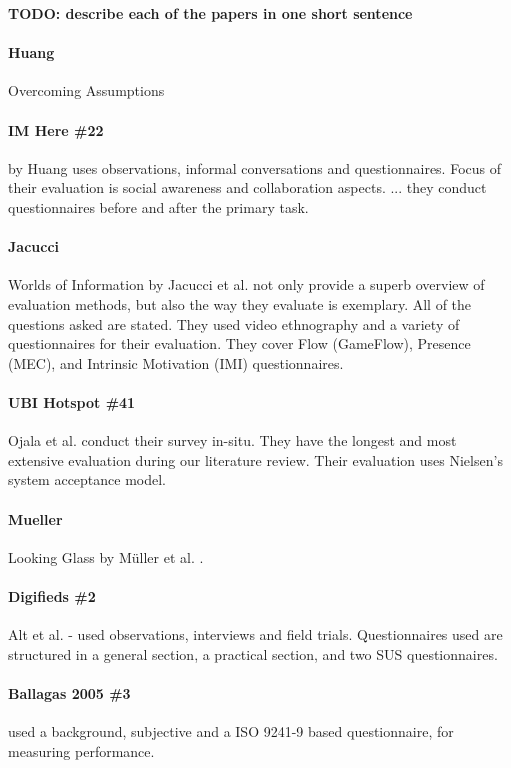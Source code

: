 \textbf{TODO: describe each of the papers in one short sentence}

	\paragraph{Huang} Overcoming Assumptions \cite{huang2008overcoming}
	\paragraph{IM Here \#22} by Huang uses observations, informal conversations and questionnaires. Focus of their evaluation is social awareness and collaboration aspects. ... they conduct questionnaires before and after the primary task.

	\paragraph{Jacucci} Worlds of Information by Jacucci et al. \cite{jacucci2010worldsofinformation} not only provide a superb overview of  evaluation methods, but also the way they evaluate is exemplary. All of the questions asked are stated. They used video ethnography and a variety of questionnaires for their evaluation. They cover Flow (GameFlow), Presence (MEC), and Intrinsic Motivation (IMI) questionnaires.

	\paragraph{UBI Hotspot \#41} Ojala et al. conduct their survey in-situ. They have the longest and most extensive evaluation during our literature review. Their evaluation uses Nielsen's system acceptance model.

	\paragraph{Mueller} Looking Glass by M{\"u}ller et al. \cite{Muller2012LookingGlass}. 

	\paragraph{Digifieds \#2} Alt et al. \cite{alt2011digifieds} - used observations, interviews and field trials. Questionnaires used are structured in a general section, a practical section, and two SUS questionnaires.

	\paragraph{Ballagas 2005 \#3} used a background, subjective and a ISO 9241-9 based questionnaire, for measuring performance.

